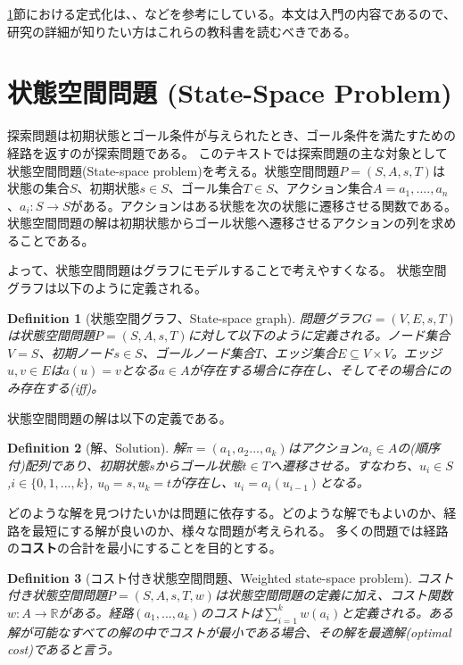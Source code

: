 \documentclass{report}
\newtheorem{definition}{Definition}
\begin{document}
\ref{sec:state-space-problem}節における定式化は\cite{russelln03}、\cite{pearl84}、\cite{edelkamp:2010:hst:1875144}などを参考にしている。本文は入門の内容であるので、研究の詳細が知りたい方はこれらの教科書を読むべきである。

\section{状態空間問題 (State-Space Problem)}
\label{sec:state-space-problem}
探索問題は初期状態とゴール条件が与えられたとき、ゴール条件を満たすための経路を返すのが探索問題である。
このテキストでは探索問題の主な対象として状態空間問題(State-space problem)を考える。状態空間問題$P = (S, A, s, T)$は状態の集合$S$、初期状態$s \in S$、ゴール集合$T \in S$、アクション集合$A = {a_1, ....,a_n}$、$a_i : S \rightarrow S$がある。アクションはある状態を次の状態に遷移させる関数である。
状態空間問題の解は初期状態からゴール状態へ遷移させるアクションの列を求めることである。

よって、状態空間問題はグラフにモデルすることで考えやすくなる。
状態空間グラフは以下のように定義される。

\begin{definition}[状態空間グラフ、State-space graph]
問題グラフ$G = (V, E, s, T)$は状態空間問題$P = (S, A, s, T)$に対して以下のように定義される。ノード集合 $V = S$、初期ノード$s \in S$、ゴールノード集合$T$、エッジ集合$E\subseteq V \times V$。エッジ$u,v\in E$は$a(u) = v$となる$a\in A$が存在する場合に存在し、そしてその場合にのみ存在する(iff)。
\end{definition}

状態空間問題の解は以下の定義である。

\begin{definition}[解、Solution]
解$\pi = (a_1,a_2...,a_k)$はアクション$a_i \in A$の(順序付)配列であり、初期状態$s$からゴール状態$t \in T$へ遷移させる。すなわち、$u_i \in S$,$i \in \{0,1,...,k\}$, $u_0 = s, u_k = t$が存在し、$u_i = a_i(u_{i-1})$となる。
\end{definition}

どのような解を見つけたいかは問題に依存する。どのような解でもよいのか、経路を最短にする解が良いのか、様々な問題が考えられる。
多くの問題では経路の{\bf コスト}の合計を最小にすることを目的とする。

\begin{definition}[コスト付き状態空間問題、Weighted state-space problem]
コスト付き状態空間問題$P = (S, A, s, T, w)$は状態空間問題の定義に加え、コスト関数$w: A \rightarrow \mathbb{R}$がある。経路$(a_1,...,a_k)$のコストは$\sum^k_{i=1}w(a_i)$と定義される。ある解が可能なすべての解の中でコストが最小である場合、その解を最適解(optimal cost)であると言う。
\end{definition}
\end{document}
